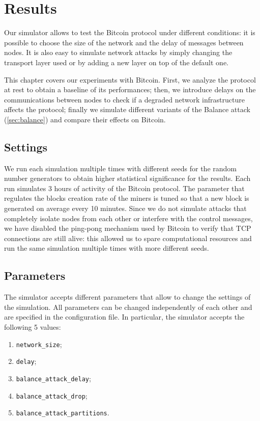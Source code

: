 \def \myplotswitdth {0.95}

\chapter{Results}
\label{chapter:results}
Our simulator allows to test the Bitcoin protocol under different conditions:
it is possible to choose the size of the network and the delay of messages between nodes.
It is also easy to simulate network attacks by simply changing the transport layer used or by adding a new layer on top of the default one.

\medskip
This chapter covers our experiments with Bitcoin.
First, we analyze the protocol at rest to obtain a baseline of its performances;
then, we introduce delays on the communications between nodes to check if a degraded network infrastructure affects the protocol;
finally we simulate different variants of the Balance attack (\cref{sec:balance}) and compare their effects on Bitcoin.


\section{Settings}
We run each simulation multiple times with different seeds for the random number generators to obtain higher statistical significance for the results.
Each run simulates \num{3} hours of activity of the Bitcoin protocol.
The parameter that regulates the blocks creation rate of the miners is tuned so that a new block is generated on average every \num{10} minutes.
Since we do not simulate attacks that completely isolate nodes from each other or interfere with the control messages, we have disabled the ping-pong mechanism used by Bitcoin to verify that TCP connections are still alive:
this allowed us to spare computational resources and run the same simulation multiple times with more different seeds.


\section{Parameters}
The simulator accepts different parameters that allow to change the settings of the simulation.
All parameters can be changed independently of each other and are specified in the configuration file.
In particular, the simulator accepts the following \num{5} values:
\begin{enumerate}
	\item \texttt{network\_size};
	\item \texttt{delay};
	\item \texttt{balance\_attack\_delay};
	\item \texttt{balance\_attack\_drop};
	\item \texttt{balance\_attack\_partitions}.
\end{enumerate}


